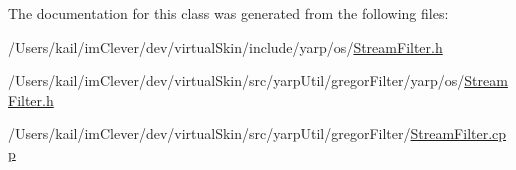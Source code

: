 The documentation for this class was generated from the following files:\begin{DoxyCompactItemize}
\item 
/Users/kail/imClever/dev/virtualSkin/include/yarp/os/\hyperlink{include_2yarp_2os_2_stream_filter_8h}{StreamFilter.h}\item 
/Users/kail/imClever/dev/virtualSkin/src/yarpUtil/gregorFilter/yarp/os/\hyperlink{src_2yarp_util_2gregor_filter_2yarp_2os_2_stream_filter_8h}{StreamFilter.h}\item 
/Users/kail/imClever/dev/virtualSkin/src/yarpUtil/gregorFilter/\hyperlink{_stream_filter_8cpp}{StreamFilter.cpp}\end{DoxyCompactItemize}
